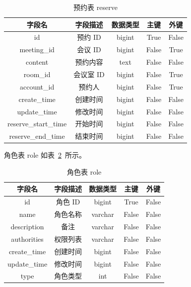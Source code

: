 \documentclass{izdthesis}
\begin{document}
\begin{table}[htbp]
  \centering
  \caption{预约表 reserve}
  \label{tab:4-5}
  \songti
  \begin{tabular}{|c|c|c|c|c|}
    \hline
    字段名 & 字段描述 & 数据类型 & 主键 & 外键 \\
    \hline
    id & 预约 ID & bigint & True & False \\
    \hline
    meeting\_id & 会议 ID & bigint & False & True \\
    \hline
    content & 预约内容 & text & False & False \\
    \hline
    room\_id & 会议室 ID & bigint & False & True \\
    \hline
    account\_id & 预约人 & bigint & False & True \\
    \hline
    create\_time & 创建时间 & bigint & False & False \\
    \hline
    update\_time & 修改时间 & bigint & False & False \\
    \hline
    reserve\_start\_time & 开始时间 & bigint & False & False \\
    \hline
    reserve\_end\_time & 结束时间 & bigint & False & False \\
    \hline
  \end{tabular}
\end{table}

角色表 role 如表~\ref{tab:4-6}~所示。

\begin{table}[htbp]
  \centering
  \caption{角色表 role}
  \label{tab:4-6}
  \songti
  \begin{tabular}{|c|c|c|c|c|}
    \hline
    字段名 & 字段描述 & 数据类型 & 主键 & 外键 \\
    \hline
    id & 角色 ID & bigint & True & False \\
    \hline
    name & 角色名称 & varchar & False & False \\
    \hline
    description & 备注 & varchar & False & False \\
    \hline
    authorities & 权限列表 & varchar & False & False \\
    \hline
    create\_time & 创建时间 & bigint & False & False \\
    \hline
    update\_time & 修改时间 & bigint & False & False \\
    \hline
    type & 角色类型 & int & False & False \\
    \hline
  \end{tabular}
\end{table}
\end{document}
